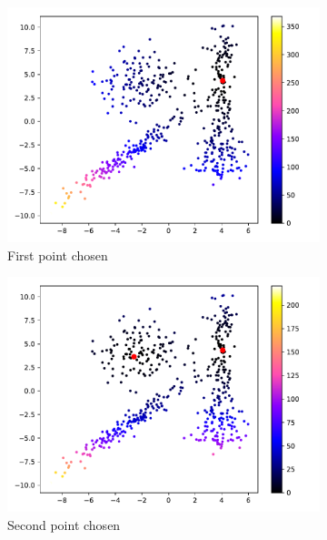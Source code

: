 \documentclass[a4paper, 11pt]{article}
\begin{document}
\begin{figure}[h!]
  \centering
  \begin{subfigure}[t]{0.48\textwidth}
    \centering
    \includegraphics[width=\textwidth]{Kmeanspp_P0.pdf}
    \caption{First point chosen}\label{fig:Kmeanspp-p0}
  \end{subfigure}
  \quad
  \begin{subfigure}[t]{0.48\textwidth}
    \centering
    \includegraphics[width=\textwidth]{Kmeanspp_P1.pdf}
    \caption{Second point chosen}\label{fig:Kmeanspp-p1}
  \end{subfigure} \\
  \begin{subfigure}[t]{0.48\textwidth}
    \centering

\end{subfigure}
\end{figure}
\end{document}
